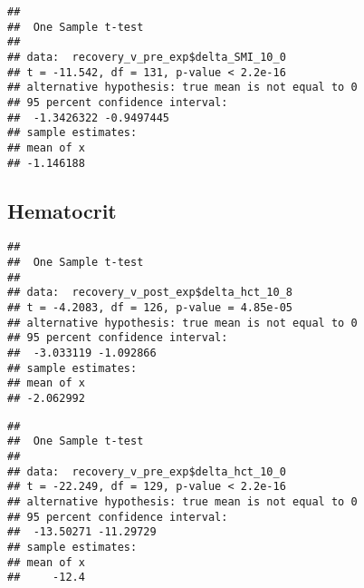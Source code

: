 \documentclass[
]{article}
\newenvironment{Shaded}{\begin{snugshade}}{\end{snugshade}}
\newcommand{\AttributeTok}[1]{\textcolor[rgb]{0.77,0.63,0.00}{#1}}
\newcommand{\DecValTok}[1]{\textcolor[rgb]{0.00,0.00,0.81}{#1}}
\newcommand{\FunctionTok}[1]{\textcolor[rgb]{0.00,0.00,0.00}{#1}}
\newcommand{\NormalTok}[1]{#1}
\newcommand{\OtherTok}[1]{\textcolor[rgb]{0.56,0.35,0.01}{#1}}
\newcommand{\SpecialCharTok}[1]{\textcolor[rgb]{0.00,0.00,0.00}{#1}}
\newcommand{\StringTok}[1]{\textcolor[rgb]{0.31,0.60,0.02}{#1}}
\begin{document}
\begin{verbatim}
## 
##  One Sample t-test
## 
## data:  recovery_v_pre_exp$delta_SMI_10_0
## t = -11.542, df = 131, p-value < 2.2e-16
## alternative hypothesis: true mean is not equal to 0
## 95 percent confidence interval:
##  -1.3426322 -0.9497445
## sample estimates:
## mean of x 
## -1.146188
\end{verbatim}

\hypertarget{hematocrit-1}{%
\subsection{Hematocrit}\label{hematocrit-1}}

\begin{Shaded}
\end{Shaded}

\begin{verbatim}
## 
##  One Sample t-test
## 
## data:  recovery_v_post_exp$delta_hct_10_8
## t = -4.2083, df = 126, p-value = 4.85e-05
## alternative hypothesis: true mean is not equal to 0
## 95 percent confidence interval:
##  -3.033119 -1.092866
## sample estimates:
## mean of x 
## -2.062992
\end{verbatim}

\begin{Shaded}
\end{Shaded}

\begin{verbatim}
## 
##  One Sample t-test
## 
## data:  recovery_v_pre_exp$delta_hct_10_0
## t = -22.249, df = 129, p-value < 2.2e-16
## alternative hypothesis: true mean is not equal to 0
## 95 percent confidence interval:
##  -13.50271 -11.29729
## sample estimates:
## mean of x 
##     -12.4
\end{verbatim}
\end{document}
